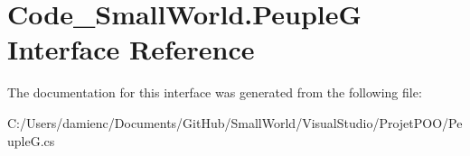 \hypertarget{interface_code___small_world_1_1_peuple_g}{\section{Code\-\_\-\-Small\-World.\-Peuple\-G Interface Reference}
\label{interface_code___small_world_1_1_peuple_g}
}


The documentation for this interface was generated from the following file\-:\begin{DoxyCompactItemize}
\item 
C\-:/\-Users/damienc/\-Documents/\-Git\-Hub/\-Small\-World/\-Visual\-Studio/\-Projet\-P\-O\-O/Peuple\-G.\-cs\end{DoxyCompactItemize}
